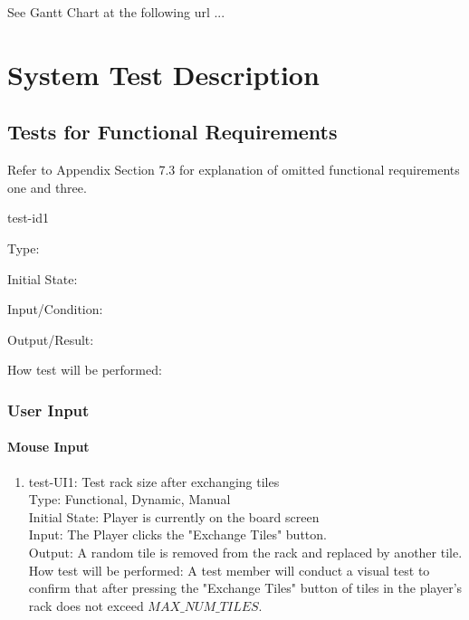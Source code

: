 \documentclass[12pt, titlepage]{article}
\begin{document}
See Gantt Chart at the following url ...

\section{System Test Description}
	
\subsection{Tests for Functional Requirements} 
Refer to Appendix Section 7.3 for explanation of omitted functional requirements one and three. 
\item{test-id1\\}

Type: 
					
Initial State: 
					
Input/Condition: 
					
Output/Result: 
					
How test will be performed: 


\subsubsection{User Input}

\paragraph{Mouse Input}

\begin{enumerate}
\item{test-UI1: Test rack size after exchanging tiles \\} %
    Type: Functional, Dynamic, Manual\\
    Initial State: Player is currently on the board screen\\
    Input: The Player clicks the "Exchange Tiles" button.\\
    Output: A random tile is removed from the rack and replaced by another tile.\\
    How test will be performed: A test member will conduct a visual test to confirm that after pressing the "Exchange Tiles" button of tiles in the player's rack does not exceed $MAX\_NUM\_TILES$.

\end{enumerate}
\end{document}
